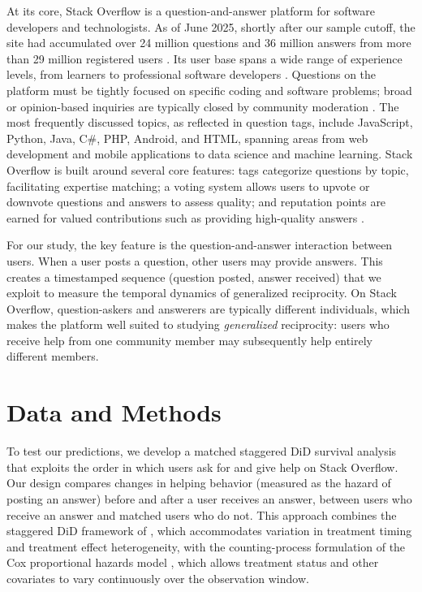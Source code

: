 At its core, Stack Overflow is a question-and-answer platform for software developers and technologists. As of June 2025, shortly after our sample cutoff, the site had accumulated over 24 million questions and 36 million answers from more than 29 million registered users \citep{stack_exchange_sites_2025}. Its user base spans a wide range of experience levels, from learners to professional software developers \citep{stack_overflow_stack_2024}. Questions on the platform must be tightly focused on specific coding and software problems; broad or opinion-based inquiries are typically closed by community moderation \citep{stack_exchange_inc_how_2024}. The most frequently discussed topics, as reflected in question tags, include JavaScript, Python, Java, C\#, PHP, Android, and HTML, spanning areas from web development and mobile applications to data science and machine learning. Stack Overflow is built around several core features: tags categorize questions by topic, facilitating expertise matching; a voting system allows users to upvote or downvote questions and answers to assess quality; and reputation points are earned for valued contributions such as providing high-quality answers \citep{stack_exchange_inc_how_2024}.

For our study, the key feature is the question-and-answer interaction between users. When a user posts a question, other users may provide answers. This creates a timestamped sequence (question posted, answer received) that we exploit to measure the temporal dynamics of generalized reciprocity. On Stack Overflow, question-askers and answerers are typically different individuals, which makes the platform well suited to studying \textit{generalized} reciprocity: users who receive help from one community member may subsequently help entirely different members.

\section{Data and Methods}
\label{sec:methods}

To test our predictions, we develop a matched staggered DiD survival analysis that exploits the order in which users ask for and give help on Stack Overflow. Our design compares changes in helping behavior (measured as the hazard of posting an answer) before and after a user receives an answer, between users who receive an answer and matched users who do not. This approach combines the staggered DiD framework of \citet{callaway_santanna_2021}, which accommodates variation in treatment timing and treatment effect heterogeneity, with the counting-process formulation of the Cox proportional hazards model \citep{andersen_gill_1982}, which allows treatment status and other covariates to vary continuously over the observation window.

